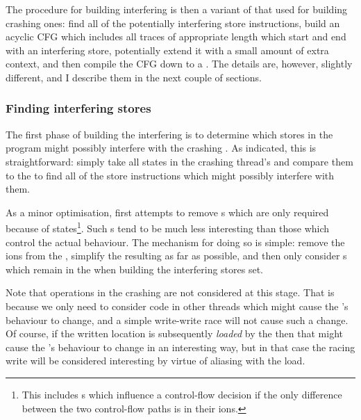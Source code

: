 The procedure for building interfering {\StateMachines} is then a
variant of that used for building crashing ones: find all of the
potentially interfering store instructions, build an acyclic CFG which
includes all traces of appropriate length which start and end with an
interfering store, potentially extend it with a small amount of extra
context, and then compile the CFG down to a {\StateMachine}.  The
details are, however, slightly different, and I describe them in the
next couple of sections.

\subsubsection{Finding interfering stores}


The first phase of building the interfering {\StateMachines} is to
determine which stores in the program might possibly interfere with
the crashing {\StateMachine}.  As indicated, this is straightforward:
simply take all  states in the crashing thread's
{\StateMachine} and compare them to the  to
find all of the store instructions which might possibly interfere with
them.

As a minor optimisation, {\implementation} first attempts to remove
s which are only required because of 
states\footnote{This includes s which influence a
  {\StateMachine} control-flow decision if the only difference between
  the two control-flow paths is in their ions.}.  Such
s tend to be much less interesting than those which
control the {\StateMachines} actual behaviour.  The mechanism for
doing so is simple: remove the ions from the
{\StateMachine}, simplify the resulting {\StateMachine} as far as
possible, and then only consider s which remain in the
{\StateMachine} when building the interfering stores set.

Note that  operations in the crashing {\StateMachine} are
not considered at this stage.  That is because we only need to
consider code in other threads which might cause the 's behaviour to change, and a simple write-write race will
not cause such a change.  Of course, if the written location is
subsequently \emph{loaded} by the  then that
might cause the 's behaviour to change in an
interesting way, but in that case the racing write will be considered
interesting by virtue of aliasing with the load.

